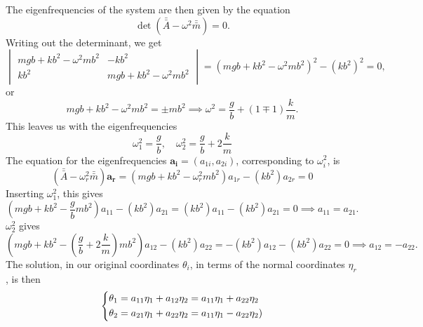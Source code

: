 \documentclass{article}
\begin{document}
        The eigenfrequencies of the system are then given by the equation
        \begin{equation*}
            \det(\bar {\bar A} - \omega^2 \bar {\bar m}) = 0.
        \end{equation*}
        Writing out the determinant, we get 
        \begin{equation*}
            \begin{vmatrix}
                mgb + kb^2 - \omega^2 mb^2 & -kb^2 \\
                kb^2 & mgb + kb^2 - \omega^2 mb^2
            \end{vmatrix}
            = (mgb + kb^2 - \omega^2 mb^2)^2 - (kb^2)^2 = 0,
        \end{equation*}
        or
        \begin{equation*}
        mgb + kb^2 - \omega^2 mb^2 = \pm mb^2 \implies \omega^2 = \frac{g}{b} + (1 \mp 1)\frac{k}{m}.
        \end{equation*}
        This leaves us with the eigenfrequencies
        \begin{equation*}
            \omega_1^2 = \frac{g}{b}, \quad \omega_2^2 = \frac{g}{b} + 2 \frac{k}{m}
        \end{equation*}
        The equation for the eigenfrequencies $\mathbf{a_i} = (a_{1i}, a_{2i})$, corresponding to $\omega_i^2$, is
        \begin{equation*}
            (\bar {\bar A} - \omega^2_r \bar {\bar m}) \mathbf{a_r} = (mgb + kb^2 - \omega_r^2 mb^2)a_{1r} -(kb^2)a_{2r} = 0
        \end{equation*}
        Inserting $\omega_1^2$, this gives 
        \begin{equation*}
            \left(mgb + kb^2 - \frac{g}{b} mb^2\right)a_{11} -(kb^2)a_{21} = (kb^2)a_{11} -(kb^2)a_{21} = 0 \implies a_{11} = a_{21}.
        \end{equation*}
        $\omega_2^2$ gives 
        \begin{equation*}
            \left(mgb + kb^2 - \left(\frac{g}{b} +2\frac{k}{m}\right)mb^2\right)a_{12} -(kb^2)a_{22} = -(kb^2)a_{12} -(kb^2)a_{22} = 0 \implies a_{12} = -a_{22}.
        \end{equation*}
        The solution, in our original coordinates $\theta_i$, in terms of the normal coordinates $\eta_r$, is then
        \begin{equation*}
            \begin{dcases}
                \theta_1 = a_{11} \eta_1 + a_{12} \eta_2 = a_{11} \eta_1 + a_{22}\eta_2 \\
                \theta_2 = a_{21} \eta_1 + a_{22} \eta_2 = a_{11} \eta_1 - a_{22} \eta_2) \\
            \end{dcases}
        \end{equation*}
\end{document}
